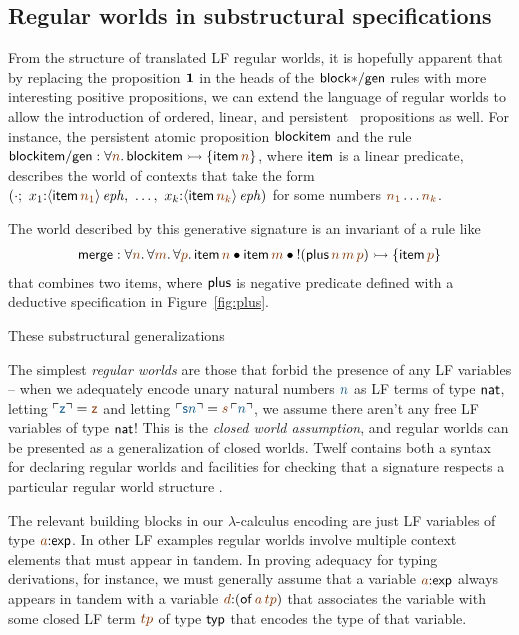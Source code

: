 \subsection{Regular worlds in substructural specifications}

From the structure of translated LF regular worlds, it is hopefully
apparent that by replacing the proposition $\mathbf{1}$ in the heads of the
${\sf block{*}/gen}$ rules with more interesting positive
\sls propositions,  we can extend the language of regular
worlds to allow the introduction of ordered, linear, and persistent
\sls~propositions as well. For instance, the persistent atomic proposition
${\sf blockitem}$ and the rule
${\sf blockitem/gen} : 
\forall \lf{n}. \, {\sf blockitem} \lefti \{ {\sf item}\,\lf{n} \}$,
where ${\sf item}$ is a linear predicate,
describes the world of contexts that take the form
$\left(\cdot; ~ x_1{:}\iseph{\susp{{\sf item}\,\lf{n_1}}}, ~
         \ldots, ~
         x_k{:}\iseph{\susp{{\sf item}\,\lf{n_k}}}\right)$
for some numbers $\lf{n_1}\ldots\lf{n_k}$. 

The world described by this generative signature is an invariant of a
rule like
\begin{align*}
  {\sf merge} : 
  \forall \lf{n}.\,\forall\lf{m}.\,\forall\lf{p}.\,
   {\sf item}\,\lf{n} \fuse
   {\sf item}\,\lf{m} \fuse
   {!}({\sf plus}\,\lf{n}\,\lf{m}\,\lf{p}) 
    \lefti \{ {\sf item}\,\lf{p} \}
\end{align*}
that combines two items,
where ${\sf plus}$ is  negative predicate defined with a deductive
specification in 
Figure~\ref{fig:plus}.  

These substructural generalizations 




The
simplest {\it regular worlds} are those that forbid the presence of
any LF variables -- when we adequately encode unary natural numbers
$\obj{n}$ as LF terms of type ${\sf nat}$, letting $\interp{\sf z} =
\lf{\sf z}$ and letting $\interp{{\sf s} n} = \lf{s}\,\interp{n}$, we
assume there aren't any free LF variables of type ${\sf nat}$! This is
the {\it closed world assumption}, and regular worlds can be presented
as a generalization of closed worlds.  Twelf contains both a syntax
for declaring regular worlds and facilities for checking that a
signature respects a particular regular world structure
\cite{schurmann00automating}.

The relevant building blocks in our $\lambda$-calculus encoding are
just LF variables of type $\lf{a}{:}{\sf exp}$. In other LF examples
regular worlds involve multiple context elements that must appear in
tandem. In proving adequacy for typing derivations, for instance, we
must generally assume that a variable $\lf{a}{:}{\sf exp}$ always
appears in tandem with a variable $\lf{d}{:}({\sf
  of}\,\lf{a}\,\lf{tp})$ that associates the variable with some closed
LF term $\lf{tp}$ of type ${\sf typ}$ that encodes the type of that
variable.

